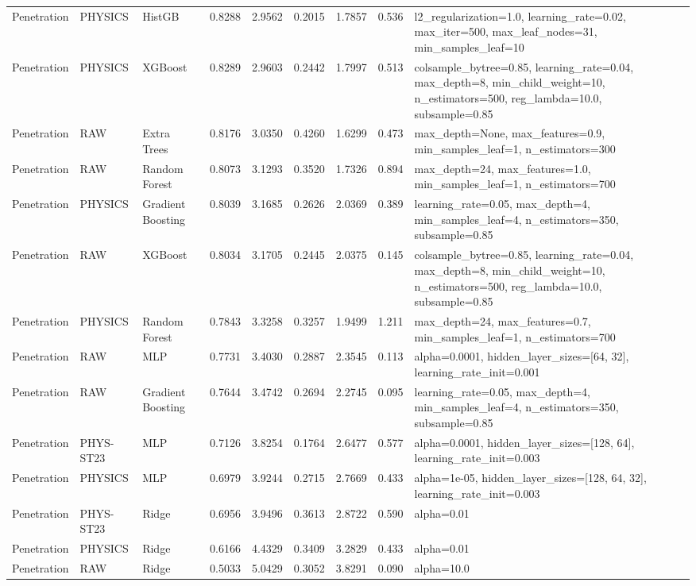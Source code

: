\documentclass[11pt]{article}
\begin{document}
\begin{landscape}
\begin{longtable}{p{}p{}p{}rrrrrp{}}
Penetration & PHYSICS & HistGB & 0.8288 & 2.9562 & 0.2015 & 1.7857 & 0.536 & \footnotesize\ttfamily l2\_regularization=1.0, learning\_rate=0.02, max\_iter=500, max\_leaf\_nodes=31, min\_samples\_leaf=10 \\
Penetration & PHYSICS & XGBoost & 0.8289 & 2.9603 & 0.2442 & 1.7997 & 0.513 & \footnotesize\ttfamily colsample\_bytree=0.85, learning\_rate=0.04, max\_depth=8, min\_child\_weight=10, n\_estimators=500, reg\_lambda=10.0, subsample=0.85 \\
Penetration & RAW & Extra Trees & 0.8176 & 3.0350 & 0.4260 & 1.6299 & 0.473 & \footnotesize\ttfamily max\_depth=None, max\_features=0.9, min\_samples\_leaf=1, n\_estimators=300 \\
Penetration & RAW & Random Forest & 0.8073 & 3.1293 & 0.3520 & 1.7326 & 0.894 & \footnotesize\ttfamily max\_depth=24, max\_features=1.0, min\_samples\_leaf=1, n\_estimators=700 \\
Penetration & PHYSICS & Gradient Boosting & 0.8039 & 3.1685 & 0.2626 & 2.0369 & 0.389 & \footnotesize\ttfamily learning\_rate=0.05, max\_depth=4, min\_samples\_leaf=4, n\_estimators=350, subsample=0.85 \\
Penetration & RAW & XGBoost & 0.8034 & 3.1705 & 0.2445 & 2.0375 & 0.145 & \footnotesize\ttfamily colsample\_bytree=0.85, learning\_rate=0.04, max\_depth=8, min\_child\_weight=10, n\_estimators=500, reg\_lambda=10.0, subsample=0.85 \\
Penetration & PHYSICS & Random Forest & 0.7843 & 3.3258 & 0.3257 & 1.9499 & 1.211 & \footnotesize\ttfamily max\_depth=24, max\_features=0.7, min\_samples\_leaf=1, n\_estimators=700 \\
Penetration & RAW & MLP & 0.7731 & 3.4030 & 0.2887 & 2.3545 & 0.113 & \footnotesize\ttfamily alpha=0.0001, hidden\_layer\_sizes=[64, 32], learning\_rate\_init=0.001 \\
Penetration & RAW & Gradient Boosting & 0.7644 & 3.4742 & 0.2694 & 2.2745 & 0.095 & \footnotesize\ttfamily learning\_rate=0.05, max\_depth=4, min\_samples\_leaf=4, n\_estimators=350, subsample=0.85 \\
Penetration & PHYS-ST23 & MLP & 0.7126 & 3.8254 & 0.1764 & 2.6477 & 0.577 & \footnotesize\ttfamily alpha=0.0001, hidden\_layer\_sizes=[128, 64], learning\_rate\_init=0.003 \\
Penetration & PHYSICS & MLP & 0.6979 & 3.9244 & 0.2715 & 2.7669 & 0.433 & \footnotesize\ttfamily alpha=1e-05, hidden\_layer\_sizes=[128, 64, 32], learning\_rate\_init=0.003 \\
Penetration & PHYS-ST23 & Ridge & 0.6956 & 3.9496 & 0.3613 & 2.8722 & 0.590 & \footnotesize\ttfamily alpha=0.01 \\
Penetration & PHYSICS & Ridge & 0.6166 & 4.4329 & 0.3409 & 3.2829 & 0.433 & \footnotesize\ttfamily alpha=0.01 \\
Penetration & RAW & Ridge & 0.5033 & 5.0429 & 0.3052 & 3.8291 & 0.090 & \footnotesize\ttfamily alpha=10.0 \\
\bottomrule
\end{longtable}
\normalsize
\end{landscape}
\end{document}
